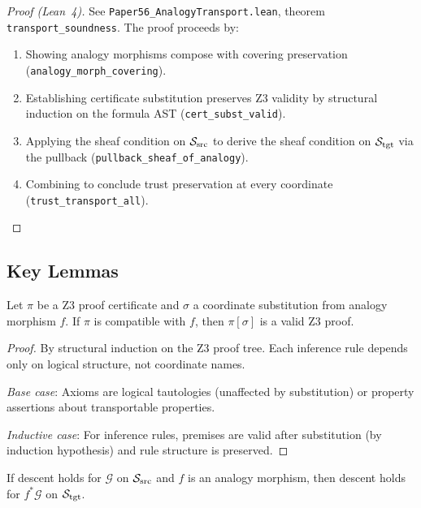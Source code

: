 \documentclass[11pt]{article}
\newcommand{\SourceSite}{\Site_{\mathrm{src}}}
\newcommand{\TargetSite}{\Site_{\mathrm{tgt}}}
\newcommand{\ProofCert}{\pi}
\begin{document}
\begin{proof}[Proof (Lean~4)]
See \texttt{Paper56\_AnalogyTransport.lean}, theorem
\texttt{transport\_soundness}.  The proof proceeds by:
\begin{enumerate}[noitemsep]
  \item Showing analogy morphisms compose with covering
        preservation (\texttt{analogy\_morph\_covering}).
  \item Establishing certificate substitution preserves Z3 validity
        by structural induction on the formula AST
        (\texttt{cert\_subst\_valid}).
  \item Applying the sheaf condition on $\SourceSite$ to derive the
        sheaf condition on $\TargetSite$ via the pullback
        (\texttt{pullback\_sheaf\_of\_analogy}).
  \item Combining to conclude trust preservation at every coordinate
        (\texttt{trust\_transport\_all}).
\end{enumerate}
\end{proof}

\subsection{Key Lemmas}

\begin{lemma}\label{lem:cert-subst}
Let $\ProofCert$ be a Z3 proof certificate and $\sigma$ a coordinate
substitution from analogy morphism $f$.  If $\ProofCert$ is compatible
with $f$, then $\ProofCert[\sigma]$ is a valid Z3 proof.
\end{lemma}

\begin{proof}
By structural induction on the Z3 proof tree.  Each inference rule
depends only on logical structure, not coordinate names.

\emph{Base case}: Axioms are logical tautologies (unaffected by
substitution) or property assertions about transportable properties.

\emph{Inductive case}: For inference rules, premises are valid after
substitution (by induction hypothesis) and rule structure is preserved.
\end{proof}

\begin{lemma}\label{lem:descent-preservation}
If descent holds for $\mathcal{G}$ on $\SourceSite$ and $f$ is an
analogy morphism, then descent holds for $f^{*}\mathcal{G}$ on
$\TargetSite$.
\end{lemma}
\end{document}
